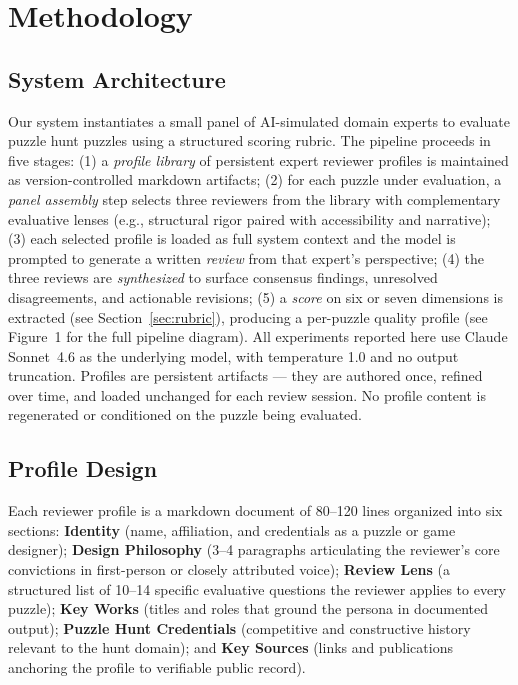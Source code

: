 \section{Methodology}

\subsection{System Architecture}

Our system instantiates a small panel of AI-simulated domain experts to evaluate puzzle hunt puzzles using a structured scoring rubric. The pipeline proceeds in five stages: (1) a \emph{profile library} of persistent expert reviewer profiles is maintained as version-controlled markdown artifacts; (2) for each puzzle under evaluation, a \emph{panel assembly} step selects three reviewers from the library with complementary evaluative lenses (e.g., structural rigor paired with accessibility and narrative); (3) each selected profile is loaded as full system context and the model is prompted to generate a written \emph{review} from that expert's perspective; (4) the three reviews are \emph{synthesized} to surface consensus findings, unresolved disagreements, and actionable revisions; (5) a \emph{score} on six or seven dimensions is extracted (see Section~\ref{sec:rubric}), producing a per-puzzle quality profile (see Figure~1 for the full pipeline diagram). All experiments reported here use Claude Sonnet~4.6 as the underlying model, with temperature 1.0 and no output truncation. Profiles are persistent artifacts --- they are authored once, refined over time, and loaded unchanged for each review session. No profile content is regenerated or conditioned on the puzzle being evaluated.

\subsection{Profile Design}

Each reviewer profile is a markdown document of 80--120 lines organized into six sections: \textbf{Identity} (name, affiliation, and credentials as a puzzle or game designer); \textbf{Design Philosophy} (3--4 paragraphs articulating the reviewer's core convictions in first-person or closely attributed voice); \textbf{Review Lens} (a structured list of 10--14 specific evaluative questions the reviewer applies to every puzzle); \textbf{Key Works} (titles and roles that ground the persona in documented output); \textbf{Puzzle Hunt Credentials} (competitive and constructive history relevant to the hunt domain); and \textbf{Key Sources} (links and publications anchoring the profile to verifiable public record).

